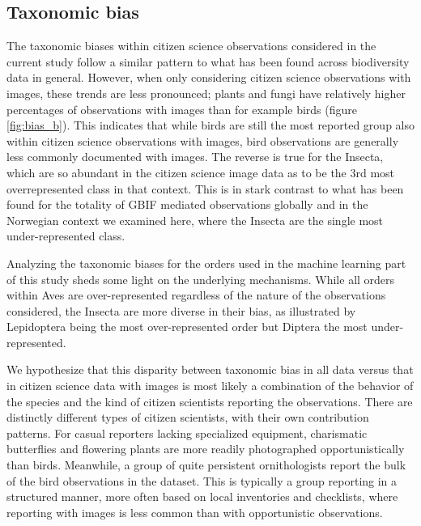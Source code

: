 \documentclass{article}
\begin{document}
\subsection*{Taxonomic bias}
The taxonomic biases within citizen science observations considered in the current study follow a similar pattern to what has been found across biodiversity data in general\autocite{Troudet2017}. However, when only considering citizen science observations with images, these trends are less pronounced; plants and fungi have relatively higher percentages of observations with images than for example birds (figure \ref{fig:bias_b}). This indicates that while birds are still the most reported group also within citizen science observations with images, bird observations are generally less commonly documented with images. The reverse is true for the Insecta, which are so abundant in the citizen science image data as to be the 3rd most overrepresented class in that context. This is in stark contrast to what has been found for the totality of GBIF mediated observations globally\autocite{Troudet2017} and in the Norwegian context we examined here, where the Insecta are the single most under-represented class.

Analyzing the taxonomic biases for the orders used in the machine learning part of this study sheds some light on the underlying mechanisms. While all orders within Aves are over-represented regardless of the nature of the observations considered, the Insecta are more diverse in their bias, as illustrated by Lepidoptera being the most over-represented order but Diptera the most under-represented. 

We hypothesize that this disparity between taxonomic bias in all data versus that in citizen science data with images is most likely a combination of the behavior of the species and the kind of citizen scientists reporting the observations. There are distinctly different types of citizen scientists, with their own contribution patterns\autocite{Aristeidou2017}. For casual reporters lacking specialized equipment, charismatic butterflies and flowering plants are more readily photographed opportunistically than birds. Meanwhile, a group of quite persistent ornithologists report the bulk of the bird observations in the dataset. This is typically a group reporting in a structured manner, more often based on local inventories and checklists, where reporting with images is less common than with opportunistic observations.
\end{document}
